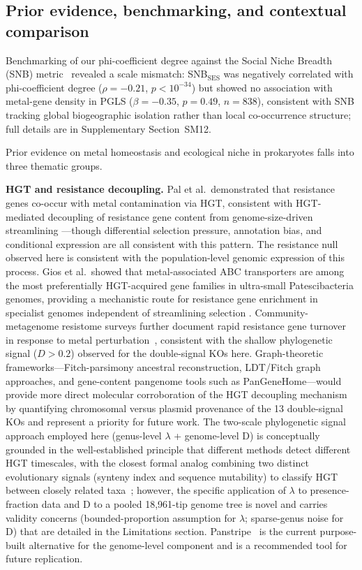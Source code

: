 \documentclass[times]{zHenriquesLab-StyleBioRxiv}
\begin{document}

\subsection{Prior evidence, benchmarking, and contextual comparison}

Benchmarking of our phi-coefficient degree against the Social Niche Breadth
(SNB) metric~\cite{vonmeijenfeldt2023} revealed a scale mismatch: SNB$_\text{SES}$
was negatively correlated with phi-coefficient degree ($\rho = -0.21$,
$p < 10^{-34}$) but showed no association with metal-gene density in PGLS
($\beta = -0.35$, $p = 0.49$, $n = 838$), consistent with SNB tracking
global biogeographic isolation rather than local co-occurrence structure;
full details are in Supplementary Section~SM12.

Prior evidence on metal homeostasis and ecological niche in prokaryotes falls into three thematic groups.

\textbf{HGT and resistance decoupling.} Pal et al.\ demonstrated that resistance genes co-occur with metal contamination via HGT, consistent with HGT-mediated decoupling of resistance gene content from genome-size-driven streamlining \cite{pal2015}---though differential selection pressure, annotation bias, and conditional expression are all consistent with this pattern. The resistance null observed here is consistent with the population-level genomic expression of this process. Gios et al.\ showed that metal-associated ABC transporters are among the most preferentially HGT-acquired gene families in ultra-small Patescibacteria genomes, providing a mechanistic route for resistance gene enrichment in specialist genomes independent of streamlining selection \cite{gios2025}. Community-metagenome resistome surveys further document rapid resistance gene turnover in response to metal perturbation~\cite{hemme2016}, consistent with the shallow phylogenetic signal ($D > 0.2$) observed for the double-signal KOs here. Graph-theoretic frameworks---Fitch-parsimony ancestral reconstruction, LDT/Fitch graph approaches, and gene-content pangenome tools such as PanGeneHome---would provide more direct molecular corroboration of the HGT decoupling mechanism by quantifying chromosomal versus plasmid provenance of the 13 double-signal KOs and represent a priority for future work. The two-scale phylogenetic signal approach employed here (genus-level $\lambda$ + genome-level D) is conceptually grounded in the well-established principle that different methods detect different HGT timescales, with the closest formal analog combining two distinct evolutionary signals (synteny index and sequence mutability) to classify HGT between closely related taxa~\cite{adato2015}; however, the specific application of $\lambda$ to presence-fraction data and D to a pooled 18,961-tip genome tree is novel and carries validity concerns (bounded-proportion assumption for $\lambda$; sparse-genus noise for D) that are detailed in the Limitations section. Panstripe~\cite{tonkinhill2023} is the current purpose-built alternative for the genome-level component and is a recommended tool for future replication.
\end{document}
